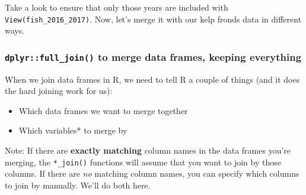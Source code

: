 \documentclass[]{book}
\newenvironment{Shaded}{\begin{snugshade}}{\end{snugshade}}
\newcommand{\CommentTok}[1]{\textcolor[rgb]{0.56,0.35,0.01}{\textit{#1}}}
\newcommand{\DecValTok}[1]{\textcolor[rgb]{0.00,0.00,0.81}{#1}}
\newcommand{\KeywordTok}[1]{\textcolor[rgb]{0.13,0.29,0.53}{\textbf{#1}}}
\newcommand{\NormalTok}[1]{#1}
\newcommand{\OperatorTok}[1]{\textcolor[rgb]{0.81,0.36,0.00}{\textbf{#1}}}
\newcommand{\StringTok}[1]{\textcolor[rgb]{0.31,0.60,0.02}{#1}}
\providecommand{\tightlist}{%
  \setlength{\itemsep}{0pt}\setlength{\parskip}{0pt}}
\begin{document}
\begin{Shaded}
\end{Shaded}

Take a look to ensure that only those years are included with \texttt{View(fish\_2016\_2017)}. Now, let's merge it with our kelp fronds data in different ways.

\hypertarget{dplyrfull_join-to-merge-data-frames-keeping-everything}{%
\subsubsection{\texorpdfstring{\texttt{dplyr::full\_join()} to merge data frames, keeping everything}{dplyr::full\_join() to merge data frames, keeping everything}}\label{dplyrfull_join-to-merge-data-frames-keeping-everything}}

When we join data frames in R, we need to tell R a couple of things (and it does the hard joining work for us):

\begin{itemize}
\tightlist
\item
  Which data frames we want to merge together
\item
  Which variables* to merge by
\end{itemize}

Note: If there are \textbf{exactly matching} column names in the data frames you're merging, the \texttt{*\_join()} functions will assume that you want to join by those columns. If there are \emph{no} matching column names, you can specify which columns to join by manually. We'll do both here.

\begin{Shaded}
\end{Shaded}
\end{document}
